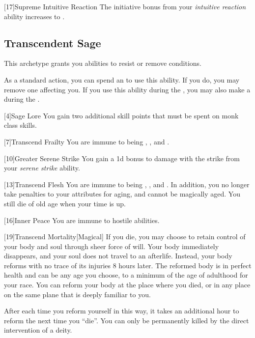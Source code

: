         [17]{Supreme Intuitive Reaction}
        The initiative bonus from your \textit{intuitive reaction} ability increases to .

    \subsection{Transcendent Sage}
        This archetype grants you abilities to resist or remove conditions.

         As a standard action, you can spend an  to use this ability.
        If you do, you may remove one  affecting you.
        If you use this ability during the , you may also make a  during the .

        [4]{Sage Lore} You gain two additional skill points that must be spent on monk class skills.

        [7]{Transcend Frailty}
        You are immune to being , , and .

        [10]{Greater Serene Strike} You gain a \plus1d bonus to damage with the strike from your \textit{serene strike} ability.

        [13]{Transcend Flesh}
        You are immune to being , , and .
        In addition, you no longer take penalties to your attributes for aging, and cannot be magically aged.
        You still die of old age when your time is up.

        [16]{Inner Peace}
        You are immune to hostile  abilities.

        [19]{Transcend Mortality}[Magical]
        If you die, you may choose to retain control of your body and soul through sheer force of will.
        Your body immediately disappears, and your soul does not travel to an afterlife.
        Instead, your body reforms with no trace of its injuries 8 hours later.
        The reformed body is in perfect health and can be any age you choose, to a minimum of the age of adulthood for your race.
        You can reform your body at the place where you died, or in any place on the same plane that is deeply familiar to you.

        After each time you reform yourself in this way, it takes an additional hour to reform the next time you ``die''.
        You can only be permanently killed by the direct intervention of a deity.

